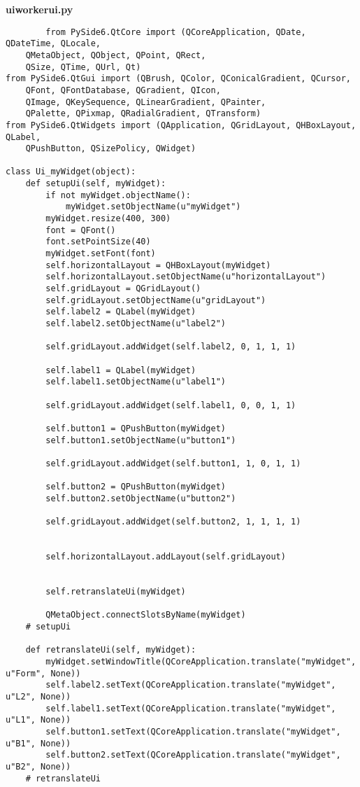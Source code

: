 \documentclass[12pt,a4paper]{article}
\begin{document}
    \textbf{uiworkerui.py}
    \begin{lstlisting}
        from PySide6.QtCore import (QCoreApplication, QDate, QDateTime, QLocale,
    QMetaObject, QObject, QPoint, QRect,
    QSize, QTime, QUrl, Qt)
from PySide6.QtGui import (QBrush, QColor, QConicalGradient, QCursor,
    QFont, QFontDatabase, QGradient, QIcon,
    QImage, QKeySequence, QLinearGradient, QPainter,
    QPalette, QPixmap, QRadialGradient, QTransform)
from PySide6.QtWidgets import (QApplication, QGridLayout, QHBoxLayout, QLabel,
    QPushButton, QSizePolicy, QWidget)

class Ui_myWidget(object):
    def setupUi(self, myWidget):
        if not myWidget.objectName():
            myWidget.setObjectName(u"myWidget")
        myWidget.resize(400, 300)
        font = QFont()
        font.setPointSize(40)
        myWidget.setFont(font)
        self.horizontalLayout = QHBoxLayout(myWidget)
        self.horizontalLayout.setObjectName(u"horizontalLayout")
        self.gridLayout = QGridLayout()
        self.gridLayout.setObjectName(u"gridLayout")
        self.label2 = QLabel(myWidget)
        self.label2.setObjectName(u"label2")

        self.gridLayout.addWidget(self.label2, 0, 1, 1, 1)

        self.label1 = QLabel(myWidget)
        self.label1.setObjectName(u"label1")

        self.gridLayout.addWidget(self.label1, 0, 0, 1, 1)

        self.button1 = QPushButton(myWidget)
        self.button1.setObjectName(u"button1")

        self.gridLayout.addWidget(self.button1, 1, 0, 1, 1)

        self.button2 = QPushButton(myWidget)
        self.button2.setObjectName(u"button2")

        self.gridLayout.addWidget(self.button2, 1, 1, 1, 1)


        self.horizontalLayout.addLayout(self.gridLayout)


        self.retranslateUi(myWidget)

        QMetaObject.connectSlotsByName(myWidget)
    # setupUi

    def retranslateUi(self, myWidget):
        myWidget.setWindowTitle(QCoreApplication.translate("myWidget", u"Form", None))
        self.label2.setText(QCoreApplication.translate("myWidget", u"L2", None))
        self.label1.setText(QCoreApplication.translate("myWidget", u"L1", None))
        self.button1.setText(QCoreApplication.translate("myWidget", u"B1", None))
        self.button2.setText(QCoreApplication.translate("myWidget", u"B2", None))
    # retranslateUi

    \end{lstlisting}
\end{document}
